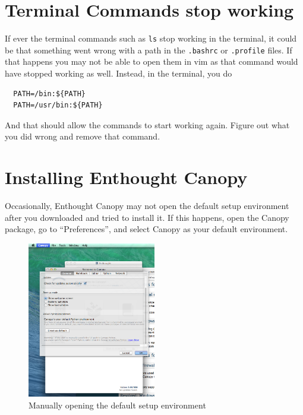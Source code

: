 \documentclass[letterpaper,10pt]{article}
\begin{document}
\section{Terminal Commands stop working}

If ever the terminal commands such as \verb"ls" stop working in the terminal, it could be that something went wrong with a path in the \verb".bashrc" or \verb".profile" files. If that happens you may not be able to open them in vim as that command would have stopped working as well. Instead, in the terminal, you do

\begin{verbatim}
  PATH=/bin:${PATH}
  PATH=/usr/bin:${PATH}
\end{verbatim}

And that should allow the commands to start working again. Figure out what you did wrong and remove that command. 



\section{Installing Enthought Canopy}

Occasionally, Enthought Canopy may not open the default setup environment after you downloaded and tried to install it. If this happens, open the Canopy package, go to ``Preferences'', and select Canopy as your default environment. 


\begin{figure}[h!]
  \centering
  \includegraphics[width=0.5\textwidth]{images/enthought_as_default}
  \caption{Manually opening the default setup environment}
  \label{fig:enthought_as_default}
\end{figure}
\end{document}
